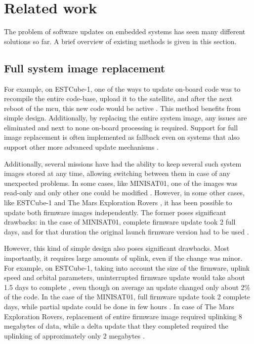 \newpage
\section{Related work}
\label{s:relatedwork}

The problem
of software updates on embedded systems has seen many different solutions so far. A brief overview of existing methods is given in this section.

\subsection{Full system image replacement}

For example, on ESTCube-1, one of the ways to update on-board code was to recompile the entire code-base, upload it to the satellite, and after the next reboot of the \gls{mcu}, this new code would be active \cite{Suenter2016}. This method benefits from simple design. Additionally, by replacing the entire system image, any
 issues are eliminated and next to none on-board processing is required. Support for full image replacement is often implemented as fallback even on systems that also support other more advanced update mechanisms \cite{Tarbe2013,Greco2005,Garrido1998}.

Additionally, several missions have had the ability to keep several such system images stored at any time, allowing switching between them in case of any unexpected problems. In some cases, like MINISAT01, one of the images was read-only and only other one could be modified \cite{Garrido1998}. However, in some other cases, like  ESTCube-1 \cite{Tarbe2013} and The Mars Exploration Rovers \cite{Greco2005}, it has been possible to update both firmware images independently. The former poses significant drawbacks: in the case of MINISAT01, complete firmware update took 2 full days, and for that duration the original launch firmware version had to be used \cite{Garrido1998}.

However, this kind of simple design also poses significant drawbacks. Most importantly, it requires large amounts of uplink, even if the change was minor. For example, on ESTCube-1, taking into account the size of the firmware, uplink speed and orbital parameters, uninterrupted firmware update would take about 1.5 days to complete \cite{Suenter2014}, even though on average an update changed only about 2\% of the code. In the case of the MINISAT01, full firmware update took 2 complete days, while partial update could be done in few hours \cite{Garrido1998}. In case of The Mars Exploration Rovers, replacement of entire firmware image required uplinking 8 megabytes of data, while a delta update that they completed required the uplinking of approximately only 2 megabytes \cite{Greco2005}.

